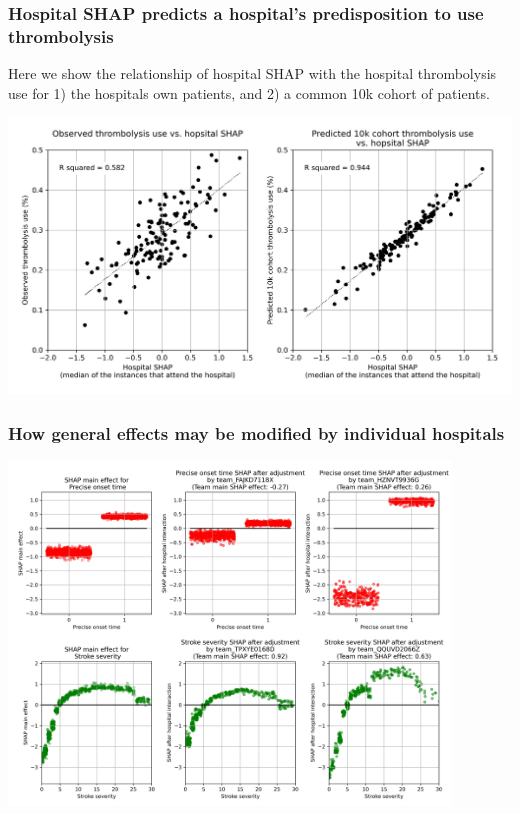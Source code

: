 \documentclass{beamer}
\begin{document}

\begin{frame}
\frametitle{Hospital SHAP predicts a hospital's predisposition to use thrombolysis}

\footnotesize Here we show the relationship of hospital SHAP with the hospital thrombolysis use for 1) the hospitals own patients, and 2) a common 10k cohort of patients.

\begin{center}
\includegraphics[width=1.0\textwidth]{./images/99_twin_correlation_scatter.jpg}
\end{center}
\end{frame}


\begin{frame}
\frametitle{How general effects may be modified by individual hospitals}

\begin{center}
\includegraphics[width=0.88\textwidth]{./images/12aa_two_way_shap_adjustment.jpg}
\end{center}
\end{frame}
\end{document}
